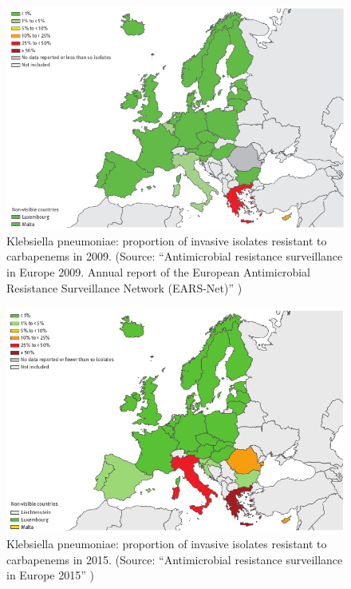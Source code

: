 \documentclass[11pt]{report}
\begin{document}
\begin{figure}[htp]
\centering
\includegraphics[scale=0.60]{img/antimicrobial2009.png}
\caption{Klebsiella pneumoniae: proportion of invasive isolates resistant to carbapenems in 2009.
(Source: ``Antimicrobial resistance surveillance in Europe 2009. Annual report of the European Antimicrobial Resistance Surveillance Network (EARS-Net)'' \cite{antimicrobial2009})}
\label{antimicrobial2009}
\end{figure}

\clearpage
\begin{figure}[htp]
\centering
\includegraphics[scale=0.60]{img/antimicrobial2015.png}
\caption{Klebsiella pneumoniae: proportion of invasive isolates resistant to carbapenems in 2015.
(Source: ``Antimicrobial resistance surveillance in Europe 2015'' \cite{antimicrobial2015})}
\label{antimicrobial2015}
\end{figure}
\end{document}
